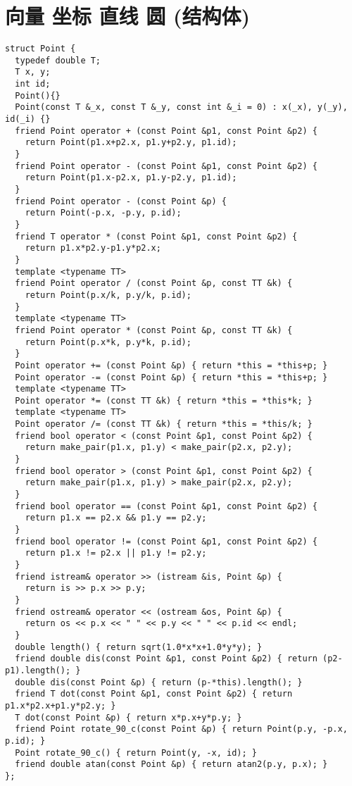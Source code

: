 \documentclass[UTF8]{ctexart}
\begin{document}
{{{{{{{{{{{\section{向量 坐标 直线 圆 (结构体) }
{\setmainfont{Consolas}
\begin{lstlisting}
struct Point {
  typedef double T;
  T x, y;
  int id;
  Point(){}
  Point(const T &_x, const T &_y, const int &_i = 0) : x(_x), y(_y), id(_i) {}
  friend Point operator + (const Point &p1, const Point &p2) {
    return Point(p1.x+p2.x, p1.y+p2.y, p1.id);
  }
  friend Point operator - (const Point &p1, const Point &p2) {
    return Point(p1.x-p2.x, p1.y-p2.y, p1.id);
  }
  friend Point operator - (const Point &p) {
    return Point(-p.x, -p.y, p.id);
  }
  friend T operator * (const Point &p1, const Point &p2) {
    return p1.x*p2.y-p1.y*p2.x;
  }
  template <typename TT>
  friend Point operator / (const Point &p, const TT &k) {
    return Point(p.x/k, p.y/k, p.id);
  }
  template <typename TT>
  friend Point operator * (const Point &p, const TT &k) {
    return Point(p.x*k, p.y*k, p.id);
  }
  Point operator += (const Point &p) { return *this = *this+p; }
  Point operator -= (const Point &p) { return *this = *this+p; }
  template <typename TT>
  Point operator *= (const TT &k) { return *this = *this*k; }
  template <typename TT>
  Point operator /= (const TT &k) { return *this = *this/k; }
  friend bool operator < (const Point &p1, const Point &p2) {
    return make_pair(p1.x, p1.y) < make_pair(p2.x, p2.y);
  }
  friend bool operator > (const Point &p1, const Point &p2) {
    return make_pair(p1.x, p1.y) > make_pair(p2.x, p2.y);
  }
  friend bool operator == (const Point &p1, const Point &p2) {
    return p1.x == p2.x && p1.y == p2.y;
  }
  friend bool operator != (const Point &p1, const Point &p2) {
    return p1.x != p2.x || p1.y != p2.y;
  }
  friend istream& operator >> (istream &is, Point &p) {
    return is >> p.x >> p.y;
  }
  friend ostream& operator << (ostream &os, Point &p) {
    return os << p.x << " " << p.y << " " << p.id << endl;
  }
  double length() { return sqrt(1.0*x*x+1.0*y*y); }
  friend double dis(const Point &p1, const Point &p2) { return (p2-p1).length(); }
  double dis(const Point &p) { return (p-*this).length(); }
  friend T dot(const Point &p1, const Point &p2) { return p1.x*p2.x+p1.y*p2.y; }
  T dot(const Point &p) { return x*p.x+y*p.y; }
  friend Point rotate_90_c(const Point &p) { return Point(p.y, -p.x, p.id); }
  Point rotate_90_c() { return Point(y, -x, id); }
  friend double atan(const Point &p) { return atan2(p.y, p.x); }
};


\end{lstlisting}}}}}}}}}}}}}
\end{document}
